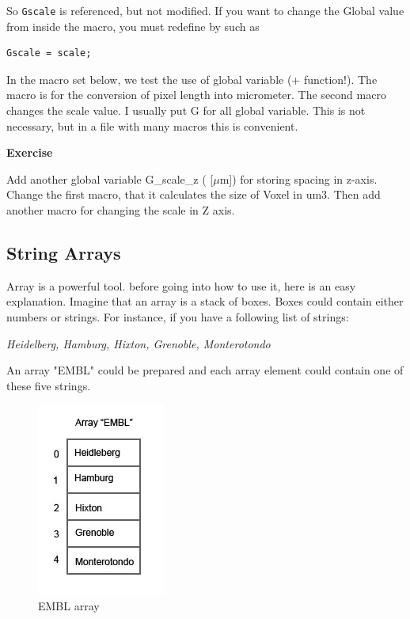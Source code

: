 \documentclass[11pt,a4paper,oneside]{report}
\newenvironment{indentexercise}[1]%
{{\setlength{\leftmargin}{2em}}%
\textbf{Exercise \thesubsection-#1}%
\begin{list}{}%
	\item%
}
{\end{list}}
\newcommand{\ilcom}[1]{\texttt{\small#1}}
\begin{document}
So \ilcom{Gscale} is referenced, but not modified. 
If you want to change the Global value from inside the macro, you must redefine by such as
\begin{lstlisting}[numbers=none]
Gscale = scale;
\end{lstlisting}
In the macro set below, we test the use of global variable (+ function!). 
The macro is for the conversion of pixel length into micrometer. 
The second macro changes the scale value. 
I usually put G for all global variable. This is not necessary, 
but in a file with many macros this is convenient.

\begin{indentexercise}{1}
Add another global variable G\_scale\_z ( [\ensuremath{\mu}m]) for storing spacing in z-axis. 
Change the first macro, that it calculates the size of Voxel in um3. 
Then add another macro for changing the scale in Z axis. 
\end{indentexercise}

\subsection{String Arrays}
Array is a powerful tool. before going into how to use it, here is an easy explanation. 
Imagine that an array is a stack of boxes. Boxes could contain either numbers or strings. 
For instance, if you have a following list of strings:

\textit{Heidelberg, Hamburg, Hixton, Grenoble, Monterotondo}

An array "EMBL" could be prepared and each array element could contain one of these five strings. 

\begin{figure}[htbp]
\begin{center}
\includegraphics[scale=0.6]{fig/fig2441_arrayScheme.jpg}
\caption{EMBL array}
\label{figEMBLarray}
\end{center}
\end{figure} 
 
\end{document}
